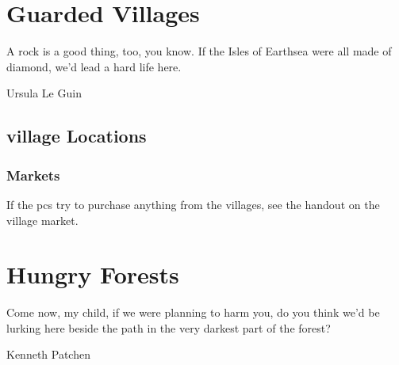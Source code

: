\documentclass[a4paper,openany]{book}
\begin{document}
\stopcontents[Town]

\stopcontents[sq]

\chapter{Guarded Villages}
\epigraph{A rock is a good thing, too, you know. If the Isles of Earthsea were all made of diamond, we'd lead a hard life here.}{Ursula Le Guin}

\section{\Gls{village} Locations}

\begin{multicols}{2}

\subsection{Markets}

If the \glspl{pc} try to purchase anything from the \glspl{village}, see the handout on the village market.

%
%
%



\end{multicols}





%

%

%



\chapter{Hungry Forests}
\epigraph{Come now, my child, if we were planning to harm you, do you think we'd be lurking here beside the path in the very darkest part of the forest?}{Kenneth Patchen}
\end{document}
